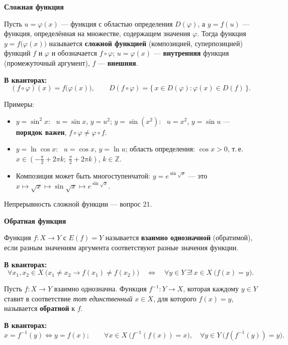 \documentclass[a4paper,11pt]{article}
\newcommand{\kv}{\par\noindent\textbf{\textcolor{oprc!85!black}{В кванторах:}}}
\newcommand{\podr}[1]{\par\needspace{8\baselineskip}\medskip
  {\large\bfseries\textcolor{oprc!80!black}{#1}}\par\nopagebreak\smallskip}
\begin{document}
\podr{Сложная функция}

\begin{opr}
Пусть $u = \varphi(x)$ --- функция с областью определения $D(\varphi)$, а $y = f(u)$ --- функция, определённая на множестве,
содержащем значения $\varphi$. Тогда функция $y = f\bigl(\varphi(x)\bigr)$ называется \textbf{сложной функцией} (композицией,
суперпозицией) функций $f$ и $\varphi$ и обозначается $f \circ \varphi$; $u = \varphi(x)$ --- \textbf{внутренняя} функция
(промежуточный аргумент), $f$ --- \textbf{внешняя}.
\kv
\[
  (f \circ \varphi)(x) = f\bigl(\varphi(x)\bigr), \qquad
  D(f \circ \varphi) = \{\, x \in D(\varphi) : \varphi(x) \in D(f) \,\}.
\]
\end{opr}

Примеры:
\begin{itemize}[leftmargin=*]
  \item $y = \sin^2 x$: \ $u = \sin x$, $y = u^2$; \quad $y = \sin(x^2)$: \ $u = x^2$, $y = \sin u$ --- \textbf{порядок важен}, $f \circ \varphi \ne \varphi \circ f$.
  \item $y = \ln \cos x$: \ $u = \cos x$, $y = \ln u$; область определения: $\cos x > 0$, т.\,е.
        $x \in \left(-\frac\pi2 + 2\pi k;\ \frac\pi2 + 2\pi k\right)$, $k \in \mathbb{Z}$.
  \item Композиция может быть многоступенчатой: $y = e^{\sin \sqrt{x}}$ --- это $x \mapsto \sqrt{x} \mapsto \sin \sqrt{x} \mapsto e^{\sin\sqrt{x}}$.
\end{itemize}
Непрерывность сложной функции --- вопрос 21.

\podr{Обратная функция}

\begin{opr}
Функция $f\colon X \to Y$ с $E(f) = Y$ называется \textbf{взаимно однозначной} (обратимой), если разным значениям аргумента
соответствуют разные значения функции.
\kv
\[
  \forall x_1, x_2 \in X\ \bigl( x_1 \ne x_2 \to f(x_1) \ne f(x_2) \bigr)
  \quad\Leftrightarrow\quad
  \forall y \in Y\ \exists!\, x \in X\ \bigl( f(x) = y \bigr).
\]
\end{opr}

\begin{opr}
Пусть $f\colon X \to Y$ взаимно однозначна. Функция $f^{-1}\colon Y \to X$, которая каждому $y \in Y$ ставит в соответствие
\emph{тот единственный} $x \in X$, для которого $f(x) = y$, называется \textbf{обратной} к $f$.
\kv
\[
  x = f^{-1}(y) \Leftrightarrow y = f(x); \qquad
  \forall x \in X\ \bigl(f^{-1}(f(x)) = x\bigr), \quad \forall y \in Y\ \bigl(f(f^{-1}(y)) = y\bigr).
\]
\end{opr}
\end{document}
